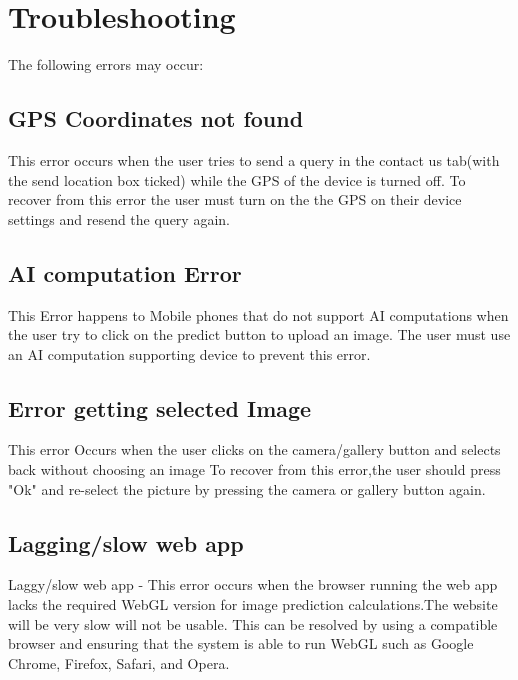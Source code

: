 \documentclass[a4paper, 12pt]{article}
\begin{document}
\pagebreak

\section{Troubleshooting}
The following errors may occur:
\subsection{GPS Coordinates not found}
This error occurs when the user tries to send a query in the contact us tab(with the send location box ticked)  while the GPS of the device is turned off.
\newline
To recover from this error the user must turn on the the GPS on their device settings and resend the query again.
\subsection{AI computation Error}
This Error happens to Mobile phones that do not support AI computations when the user try to click on the predict button to upload an image.
The user must use an AI computation supporting device to prevent this error.

\subsection{Error getting selected Image}
This error Occurs when the user clicks on the camera/gallery button and selects back without choosing an image 
\newline
To recover from this error,the user should press "Ok" and re-select the picture by pressing the camera or gallery  button again.

\subsection{Lagging/slow web app}
Laggy/slow web app - This error occurs when the browser running the web app lacks the required WebGL version for image prediction calculations.The website will be very slow will not be usable.
\newline
This can be resolved by using a compatible browser and ensuring that the system is able to run WebGL such as Google Chrome, Firefox, Safari, and Opera.
\end{document}
